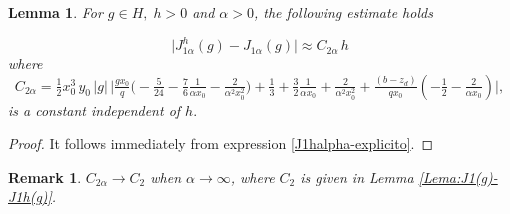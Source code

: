 \documentclass[11pt]{article}
\newtheorem{Lemma}{Lemma}
\newtheorem{Remark}{Remark}
\begin{document}
\begin{Lemma} For $g\in H, \; h>0$ and $\alpha>0$, the following estimate holds

  $$     \lvert  {J^h_{1 \alpha}}(g) - J_{1\alpha}(g) \rvert  \approx C_{2 \alpha} \, h $$
   where \[C_{2 \alpha} = \tfrac{1}{2} x_0^3\, y_0 \,|g|\, \Bigg| \tfrac{g x_0}{q} \Big( - \tfrac{5 }{24} - \tfrac{7 }{6 }\tfrac{1}{\alpha x_0} -\tfrac{2}{\alpha^2 x_0^2}\Big)+ \tfrac{1}{3}+  \tfrac{3}{2}\tfrac{1}{\alpha x_0}+\tfrac{2}{\alpha^2 x_0^2}+\tfrac{(b-z_d)}{q x_0}\left(-\tfrac{1}{2}-\tfrac{2}{\alpha x_0} \right) \Bigg|,
\] 
   is  a constant independent of $h.$
      
    \end{Lemma}
\begin{proof}
It follows immediately from expression \eqref{J1halpha-explicito}.
\end{proof}


\begin{Remark} %
 $C_{2\alpha}\to C_2$ when $\alpha\to \infty$, where $C_2$ is given in Lemma \ref{Lema:J1(g)-J1h(g)}.
\end{Remark}
\end{document}

